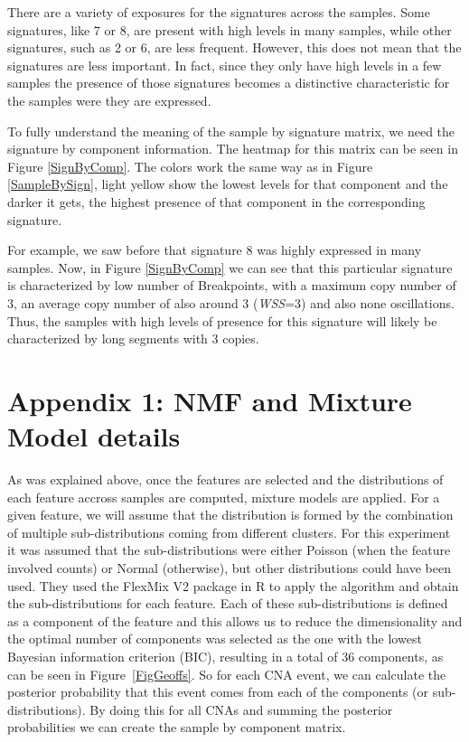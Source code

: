 \documentclass[a4paper]{article}
\begin{document}
There are a variety of exposures for the signatures across the samples. Some signatures, like 7 or 8, are present with high levels in many samples, while other signatures, such as 2 or 6, are less frequent. However, this does not mean that the signatures are less important. In fact, since they only have high levels in a few samples the presence of those signatures becomes a distinctive characteristic for the samples were they are expressed. 

To fully understand the meaning of the sample by signature matrix, we need the signature by component information. The heatmap for this matrix can be seen in Figure \ref{SignByComp}. The colors work the same way as in Figure \ref{SampleBySign}, light yellow show the lowest levels for that component and the darker it gets, the highest presence of that component in the corresponding signature.

For example, we saw before that signature 8 was highly expressed in many samples. Now, in Figure \ref{SignByComp} we can see that this particular signature is characterized by low number of Breakpoints, with a maximum copy number of 3, an average copy number of also around 3 (\textit{WSS}=3) and also none oscillations. Thus, the samples with high levels of presence for this signature will likely be characterized by long segments with 3 copies.


\clearpage
\section{Appendix 1: NMF and Mixture Model details}
As was explained above, once the features are selected and the distributions of each feature accross samples are computed, mixture models are applied. For a given feature, we will assume that the distribution is formed by the combination of multiple sub-distributions coming from different clusters. For this experiment it was assumed that the sub-distributions were either Poisson (when the feature involved counts) or Normal (otherwise), but other distributions could have been used. They used the FlexMix V2 package in R \cite{FMV2R} to apply the algorithm and obtain the sub-distributions for each feature. Each of these sub-distributions is defined as a component of the feature and this allows us to reduce the dimensionality and the optimal number of components was selected as the one with the lowest Bayesian information criterion (BIC), resulting in a total of 36 components, as can be seen in Figure \ref{FigGeoffs}. So for each CNA event, we can calculate the posterior probability that this event comes from each of the components (or sub-distributions). By doing this for all CNAs and summing the posterior probabilities we can create the sample by component matrix. 
\end{document}
